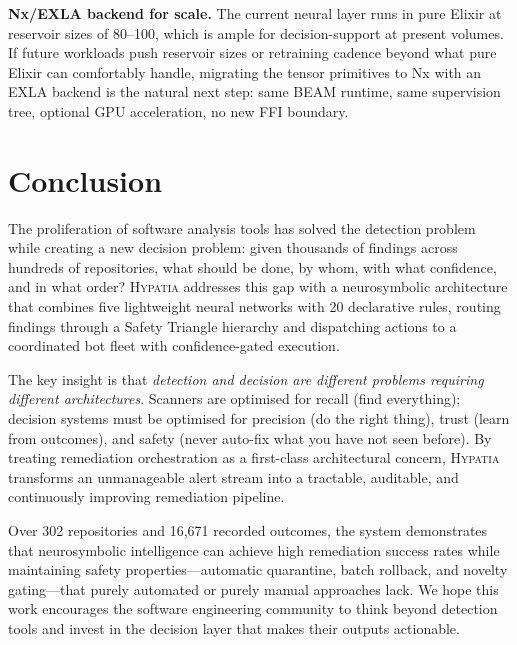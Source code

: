 \documentclass[11pt,a4paper]{article}
\begin{document}
\textbf{Nx/EXLA backend for scale.} The current neural layer runs in pure Elixir at reservoir sizes of 80--100, which is ample for decision-support at present volumes. If future workloads push reservoir sizes or retraining cadence beyond what pure Elixir can comfortably handle, migrating the tensor primitives to Nx with an EXLA backend is the natural next step: same BEAM runtime, same supervision tree, optional GPU acceleration, no new FFI boundary.


\section{Conclusion}
\label{sec:conclusion}

The proliferation of software analysis tools has solved the detection problem while creating a new decision problem: given thousands of findings across hundreds of repositories, what should be done, by whom, with what confidence, and in what order? \textsc{Hypatia} addresses this gap with a neurosymbolic architecture that combines five lightweight neural networks with 20 declarative rules, routing findings through a Safety Triangle hierarchy and dispatching actions to a coordinated bot fleet with confidence-gated execution.

The key insight is that \emph{detection and decision are different problems requiring different architectures}. Scanners are optimised for recall (find everything); decision systems must be optimised for precision (do the right thing), trust (learn from outcomes), and safety (never auto-fix what you have not seen before). By treating remediation orchestration as a first-class architectural concern, \textsc{Hypatia} transforms an unmanageable alert stream into a tractable, auditable, and continuously improving remediation pipeline.

Over 302 repositories and 16{,}671 recorded outcomes, the system demonstrates that neurosymbolic intelligence can achieve high remediation success rates while maintaining safety properties---automatic quarantine, batch rollback, and novelty gating---that purely automated or purely manual approaches lack. We hope this work encourages the software engineering community to think beyond detection tools and invest in the decision layer that makes their outputs actionable.


\end{document}
